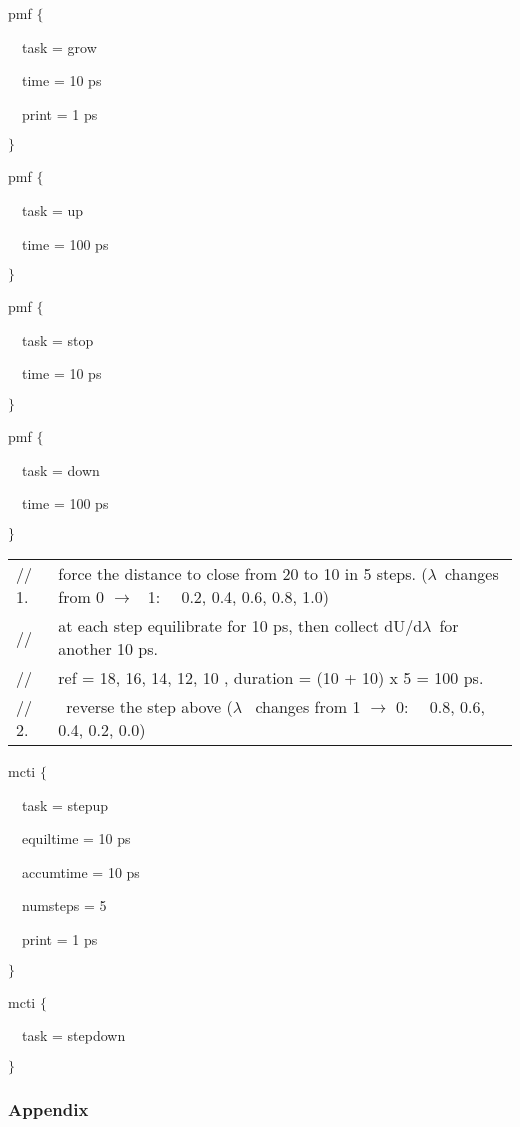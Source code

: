 pmf $\{$

~~task = grow

~~time = 10 ps

~~print = 1 ps

$\}$

pmf $\{$

~~task = up

~~time = 100 ps

$\}$

pmf $\{$

~~task = stop

~~time = 10 ps

$\}$

pmf $\{$

~~task = down

~~time = 100 ps

$\}\medskip $

\begin{tabular}{ll}
{\footnotesize // 1. } & {\footnotesize force the distance to close from 20 
to 10 %
in 5 steps. (}$\lambda ${\footnotesize \ changes from 0 }$\rightarrow $%
{\footnotesize \ 1: ~~0.2, 0.4, 0.6, 0.8, 1.0)} \\ 
{\footnotesize // } & {\footnotesize at each step equilibrate for 10 ps,
then collect dU/d}$\lambda ${\footnotesize \ for another 10 ps.} \\ 
{\footnotesize //} & {\footnotesize ref = 18, 16, 14, 12, 10 
, duration = (10 + 10) x 5 = 100 ps.} \\ 
{\footnotesize // 2.} & {\footnotesize \ reverse the step above (}$\lambda $%
{\footnotesize \ changes from 1 }$\rightarrow $ {\footnotesize 0: ~~0.8,
0.6, 0.4, 0.2, 0.0)}
\end{tabular}

mcti $\{$

~~task = stepup

~~equiltime = 10 ps

~~accumtime = 10 ps

~~numsteps = 5

~~print = 1 ps

$\}$

mcti $\{$

~~task = stepdown

$\}$\pagebreak

\subsubsection{Appendix}

